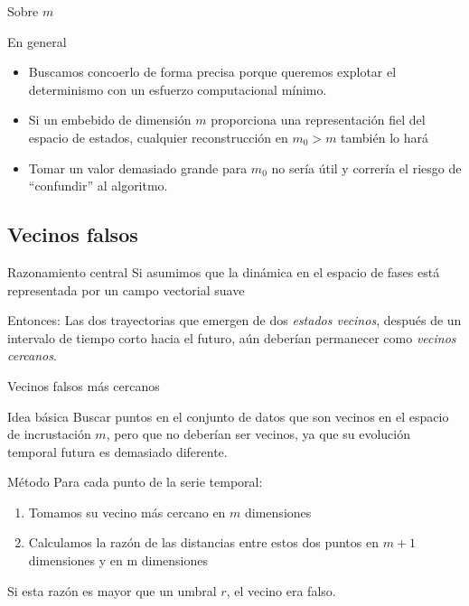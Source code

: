 \documentclass[11pt]{beamer}
\begin{document}
\begin{frame}{Sobre $m$}
	\begin{block}{En general}
		\begin{itemize}
			\item Buscamos concoerlo de forma precisa porque queremos explotar el determinismo con un esfuerzo computacional mínimo.
			\item Si un embebido de dimensión $m$ proporciona una representación fiel del espacio de estados, cualquier reconstrucción en $m_0 > m$ también lo hará
			\item Tomar un valor demasiado grande para $m_0$ no sería útil y correría el riesgo de “confundir” al algoritmo.
		\end{itemize}
	\end{block}

\end{frame}

\subsection{Vecinos falsos}
\begin{frame}{Razonamiento central}
	Si asumimos que la dinámica en el espacio de fases está representada por un campo vectorial suave
	\begin{block}{Entonces:}
		Las dos trayectorias que emergen de dos \textit{estados vecinos}, después de un intervalo de tiempo corto hacia el futuro, aún deberían permanecer como \textit{vecinos cercanos}. 
	\end{block}
\end{frame}

\begin{frame}{Vecinos falsos más cercanos}
	\begin{block}{Idea básica}
		Buscar puntos en el conjunto de datos que son vecinos en el espacio de incrustación $m$, pero que no deberían ser vecinos, ya que su evolución temporal futura es demasiado diferente.
	\end{block}
	\begin{block}{Método}
		Para cada punto de la serie temporal: 
		\begin{enumerate}
			\item Tomamos su vecino más cercano en $m$ dimensiones
			\item Calculamos la razón de las distancias entre estos dos puntos en $m + 1$ dimensiones y en m dimensiones 
		\end{enumerate}		 
		Si esta razón es mayor que un umbral $r$, el vecino era falso.
	\end{block}	
	
	
\end{frame}
\end{document}
